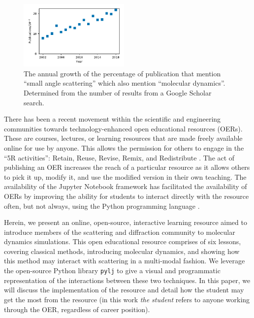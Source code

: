 \documentclass[amsmath,amssymb,twocolumn,superscriptaddress]{revtex4-1}
\begin{document}
%
\begin{figure}
\label{fig:growth}
\includegraphics[width=0.48\textwidth]{figures/chem_data_py.pdf}
\caption{The annual growth of the percentage of publication that mention ``small angle scattering'' which also mention ``molecular dynamics''. Determined from the number of results from a Google Scholar search.}
\end{figure}
%

There has been a recent movement within the scientific and engineering communities towards technology-enhanced open educational resources (OERs).
These are courses, lectures, or learning resources that are made freely available online for use by anyone.
This allows the permission for others to engage in the ``5R activities'': Retain, Reuse, Revise, Remix, and Redistribute \cite{wiley_open_2018}.
The act of publishing an OER increases the reach of a particular resource as it allows others to pick it up, modify it, and use the modified version in their own teaching.
The availability of the Jupyter Notebook framework \cite{kluyver_jupyter_2016} has facilitated the availability of OERs by improving the ability for students to interact directly with the resource often, but not always, using the Python programming language \cite{barba_cybertraining_2017}.

Herein, we present an online, open-source, interactive learning resource aimed to introduce members of the scattering and diffraction community to molecular dynamics simulations.
This open educational resource comprises of six lessons, covering classical methods, introducing molecular dynamics, and showing how this method may interact with scattering in a multi-modal fashion.
We leverage the open-source Python library \texttt{pylj} \cite{mccluskey_pylj_2018} to give a visual and programmatic representation of the interactions between these two techniques.
In this paper, we will discuss the implementation of the resource and detail how the student may get the most from the resource (in this work \emph{the student} refers to anyone working through the OER, regardless of career position).
\end{document}
